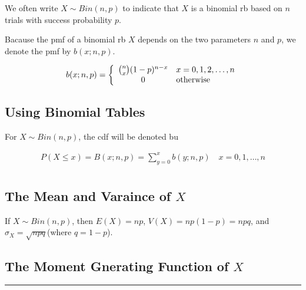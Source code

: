 \begin{notation}
    We often write $X\sim Bin(n, p)$ to indicate that $X$ is a binomial rb based on $n$ trials with success probability $p$.

    Bacause the pmf of a binomial rb $X$ depends on the two parameters $n$ and $p$, we denote the pmf by $b(x; n, p)$.
\end{notation}

\begin{theorem}
    \begin{align*}
        b(x; n, p) = \left\{\begin{array}{cl}
            \binom{n}{x} (1 - p) ^ {n-x} & x = 0, 1, 2, \dots, n \\
            0 & {\rm otherwise} \\
        \end{array}\right.
    \end{align*}
\end{theorem}

\subsection{Using Binomial Tables}

\begin{notation}
    For $X\sim Bin(n, p)$, the cdf will be denoted bu 

    \begin{align*}
        P(X\leq x) = B(x;n,p) = \sum\limits_{y=0}^x b(y;n,p) \quad x=0,1,\dots,n \\
    \end{align*}
\end{notation}

\subsection{The Mean and Varaince of $X$}

\begin{proposition}
    If $X\sim Bin(n,p)$, then $E(X) = np$, $V(X) = np(1-p) = npq$, and $\sigma_X = \sqrt{npq}$(where $q= 1- p$).
\end{proposition}

\subsection{The Moment Gnerating Function of $X$}

\noindent\rule{\textwidth}{1pt}

